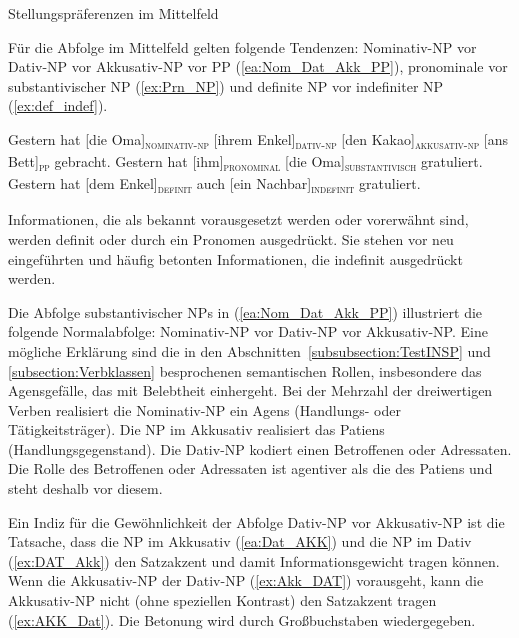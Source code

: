 \begin{Exkurs}{Stellungspräferenzen im Mittelfeld}\label{Exkurs:Stellung_MF}

\largerpage
Für die Abfolge im Mittelfeld gelten folgende Tendenzen: Nominativ-NP vor Dativ-NP vor Akkusativ-NP vor PP (\ref{ea:Nom_Dat_Akk_PP}), pronominale vor substantivischer NP (\ref{ex:Prn_NP}) und definite NP vor indefiniter NP (\ref{ex:def_indef}). 

\ea \label{ea:Abfolge_MF}
\ea \label{ea:Nom_Dat_Akk_PP} Gestern hat [die Oma]\textsubscript{\textsc{nominativ-np}} [ihrem Enkel]\textsubscript{\textsc{dativ-np}} [den Kakao]\textsubscript{\textsc{akkusativ-np}} [ans Bett]\textsubscript{\textsc{pp}} gebracht.
\ex \label{ex:Prn_NP} Gestern hat [ihm]\textsubscript{\textsc{pronominal}} [die Oma]\textsubscript{\textsc{substantivisch}} gratuliert.
\ex \label{ex:def_indef} Gestern hat [dem Enkel]\textsubscript{\textsc{definit}} auch [ein Nachbar]\textsubscript{\textsc{indefinit}} gratuliert.
\z 
\z



Informationen, die als bekannt vorausgesetzt werden oder vorerwähnt sind, werden definit oder durch ein Pronomen ausgedrückt. Sie stehen vor neu eingeführten und häufig betonten Informationen, die indefinit ausgedrückt werden.  

Die Abfolge substantivischer NPs in (\ref{ea:Nom_Dat_Akk_PP}) illustriert die folgende Normalabfolge: Nominativ-NP vor Dativ-NP vor Akkusativ-NP. Eine mögliche Erklärung sind die in den Abschnitten~\ref{subsubsection:TestINSP} und \ref{subsection:Verbklassen} besprochenen semantischen Rollen, insbesondere das Agensgefälle, das mit Belebtheit einhergeht. Bei der Mehrzahl der dreiwertigen Verben realisiert die Nominativ-NP ein Agens (Handlungs- oder Tätigkeitsträger). Die NP im Akkusativ realisiert das Patiens (Handlungsgegenstand). Die Dativ-NP kodiert einen Betroffenen oder Adressaten. Die Rolle des Betroffenen oder Adressaten ist agentiver als die des Patiens und steht deshalb vor diesem.

Ein Indiz für die Gewöhnlichkeit der Abfolge Dativ-NP vor Akkusativ-NP ist die Tatsache, dass die NP im Akkusativ (\ref{ea:Dat_AKK}) und die NP im Dativ (\ref{ex:DAT_Akk}) den Satzakzent und damit Informationsgewicht tragen können. Wenn die Akkusativ-NP der Dativ-NP (\ref{ex:Akk_DAT}) vorausgeht, kann die Akkusativ-NP nicht (ohne speziellen Kontrast) den Satzakzent tragen (\ref{ex:AKK_Dat}). Die Betonung wird durch Großbuchstaben wiedergegeben.  


\end{Exkurs}
